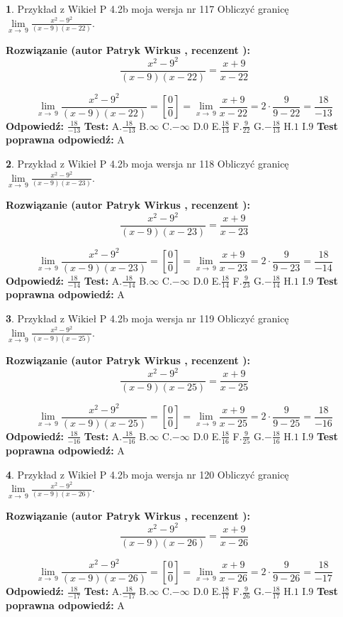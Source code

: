 \documentclass[12pt, a4paper]{article}
\theoremstyle{definition} %
\newtheorem{zad}{}
\newcommand{\zadStart}[1]{\begin{zad}#1\newline}
\newcommand{\zadStop}{\end{zad}}
\newcommand{\rozwStart}[2]{\noindent \textbf{Rozwiązanie (autor #1 , recenzent #2): }\newline}
\newcommand{\rozwStop}{\newline}
\newcommand{\odpStart}{\noindent \textbf{Odpowiedź:}\newline}
\newcommand{\odpStop}{\newline}
\newcommand{\testStart}{\noindent \textbf{Test:}\newline}
\newcommand{\testStop}{\newline}
\newcommand{\kluczStart}{\noindent \textbf{Test poprawna odpowiedź:}\newline}
\newcommand{\kluczStop}{\newline}
\begin{document}
\zadStart{Przykład z Wikieł P 4.2b moja wersja nr 117}
Obliczyć granicę $\lim\limits_{x\to\ 9}\frac{x^{2}-9^{2}}{(x-9)(x-22)}$.
\zadStop
\rozwStart{Patryk Wirkus}{}
$$\frac{x^{2}-9^{2}}{(x-9)(x-22)}=\frac{x+9}{x-22}$$

$$\lim\limits_{x\to\ 9}\frac{x^{2}-9^{2}}{(x-9)(x-22)}=[\frac{0}{0}]=\lim\limits_{x\to\ 9}\frac{x+9}{x-22}=2 \cdot \frac{9}{9-22} = \frac{18}{-13}$$
\rozwStop
\odpStart
$\frac{18}{-13}$
\odpStop
\testStart
A.$\frac{18}{-13}$
B.$\infty$
C.$-\infty$
D.$0$
E.$\frac{18}{13}$
F.$\frac{9}{22}$
G.$-\frac{18}{13}$
H.$1$
I.$9$
\testStop
\kluczStart
A
\kluczStop



\zadStart{Przykład z Wikieł P 4.2b moja wersja nr 118}
Obliczyć granicę $\lim\limits_{x\to\ 9}\frac{x^{2}-9^{2}}{(x-9)(x-23)}$.
\zadStop
\rozwStart{Patryk Wirkus}{}
$$\frac{x^{2}-9^{2}}{(x-9)(x-23)}=\frac{x+9}{x-23}$$

$$\lim\limits_{x\to\ 9}\frac{x^{2}-9^{2}}{(x-9)(x-23)}=[\frac{0}{0}]=\lim\limits_{x\to\ 9}\frac{x+9}{x-23}=2 \cdot \frac{9}{9-23} = \frac{18}{-14}$$
\rozwStop
\odpStart
$\frac{18}{-14}$
\odpStop
\testStart
A.$\frac{18}{-14}$
B.$\infty$
C.$-\infty$
D.$0$
E.$\frac{18}{14}$
F.$\frac{9}{23}$
G.$-\frac{18}{14}$
H.$1$
I.$9$
\testStop
\kluczStart
A
\kluczStop



\zadStart{Przykład z Wikieł P 4.2b moja wersja nr 119}
Obliczyć granicę $\lim\limits_{x\to\ 9}\frac{x^{2}-9^{2}}{(x-9)(x-25)}$.
\zadStop
\rozwStart{Patryk Wirkus}{}
$$\frac{x^{2}-9^{2}}{(x-9)(x-25)}=\frac{x+9}{x-25}$$

$$\lim\limits_{x\to\ 9}\frac{x^{2}-9^{2}}{(x-9)(x-25)}=[\frac{0}{0}]=\lim\limits_{x\to\ 9}\frac{x+9}{x-25}=2 \cdot \frac{9}{9-25} = \frac{18}{-16}$$
\rozwStop
\odpStart
$\frac{18}{-16}$
\odpStop
\testStart
A.$\frac{18}{-16}$
B.$\infty$
C.$-\infty$
D.$0$
E.$\frac{18}{16}$
F.$\frac{9}{25}$
G.$-\frac{18}{16}$
H.$1$
I.$9$
\testStop
\kluczStart
A
\kluczStop



\zadStart{Przykład z Wikieł P 4.2b moja wersja nr 120}
Obliczyć granicę $\lim\limits_{x\to\ 9}\frac{x^{2}-9^{2}}{(x-9)(x-26)}$.
\zadStop
\rozwStart{Patryk Wirkus}{}
$$\frac{x^{2}-9^{2}}{(x-9)(x-26)}=\frac{x+9}{x-26}$$

$$\lim\limits_{x\to\ 9}\frac{x^{2}-9^{2}}{(x-9)(x-26)}=[\frac{0}{0}]=\lim\limits_{x\to\ 9}\frac{x+9}{x-26}=2 \cdot \frac{9}{9-26} = \frac{18}{-17}$$
\rozwStop
\odpStart
$\frac{18}{-17}$
\odpStop
\testStart
A.$\frac{18}{-17}$
B.$\infty$
C.$-\infty$
D.$0$
E.$\frac{18}{17}$
F.$\frac{9}{26}$
G.$-\frac{18}{17}$
H.$1$
I.$9$
\testStop
\kluczStart
A
\kluczStop
\end{document}
